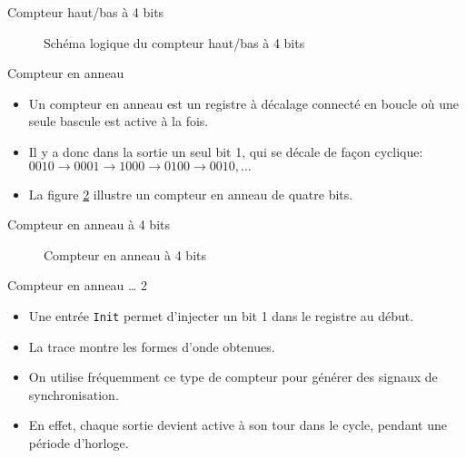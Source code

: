 \documentclass[presentation]{beamer}
\begin{document}
\begin{frame}[label={sec:org075e743}]{Compteur haut/bas à 4 bits}
\begin{figure}[htbp]
\centering

\caption{\label{fig:org58bad3b}Schéma logique du compteur haut/bas à 4 bits}
\end{figure}
\end{frame}

\begin{frame}[label={sec:orge19f842}]{Compteur en anneau}
\begin{itemize}
\item Un compteur en anneau est un registre à décalage connecté en boucle où une seule bascule est active à la fois.

\item Il y a donc dans la sortie un seul bit 1, qui se décale de façon cyclique: \(0010 \rightarrow 0001 \rightarrow 1000 \rightarrow 0100 \rightarrow 0010, \ldots\)

\item La figure \ref{fig:orgb9e92c7} illustre un compteur en anneau de quatre bits.
\end{itemize}
\end{frame}

\begin{frame}[label={sec:org368f74a}]{Compteur en anneau à 4 bits}
\begin{figure}[htbp]
\centering

\caption{\label{fig:orgb9e92c7}Compteur en anneau à 4 bits}
\end{figure}
\end{frame}

\begin{frame}[label={sec:orgfa80afb},fragile]{Compteur en anneau \ldots{} 2}
 \begin{itemize}
\item Une entrée \texttt{Init} permet d'injecter un bit 1 dans le registre au début.

\item La trace montre les formes d'onde obtenues.

\item On utilise fréquemment ce type de compteur pour générer des signaux de synchronisation.

\item En effet, chaque sortie devient active à son tour dans le cycle, pendant une période d'horloge.
\end{itemize}
\end{frame}
\end{document}
